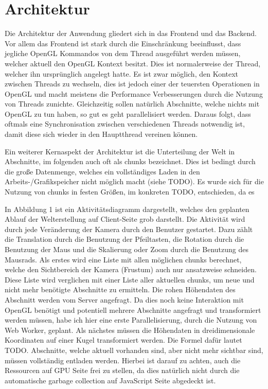 

\section{Architektur}
Die Architektur der Anwendung gliedert sich in das Frontend und das Backend. Vor allem das Frontend ist stark durch die Einschränkung beeinflusst, dass jegliche OpenGL Kommandos von dem Thread ausgeführt werden müssen, welcher aktuell den OpenGL Kontext besitzt. Dies ist normalerweise der Thread, welcher ihn ursprünglich angelegt hatte. Es ist zwar möglich, den Kontext zwischen Threads zu wechseln, dies ist jedoch einer der teuersten Operationen in OpenGL und macht meistens die Performance Verbesserungen durch die Nutzung von Threads zunichte. Gleichzeitig sollen natürlich Abschnitte, welche nichts mit OpenGL zu tun haben, so gut es geht parallelisiert werden. Daraus folgt, dass oftmals eine Synchronisation zwischen verschiedenen Threads notwendig ist, damit diese sich wieder in den Hauptthread vereinen können.

Ein weiterer Kernaspekt der Architektur ist die Unterteilung der Welt in Abschnitte, im folgenden auch oft als chunks bezeichnet. Dies ist bedingt durch die große Datenmenge, welches ein vollständiges Laden in den Arbeits-/Grafikspeicher nicht möglich macht (siehe TODO). Es wurde sich für die Nutzung von chunks in festen Größen, im konkreten TODO, entschieden, da es 

In Abbildung 1 ist ein Aktivitätsdiagramm dargestellt, welches den geplanten Ablauf der Welterstellung auf Client-Seite grob darstellt. Die Aktivität wird durch jede Veränderung der Kamera durch den Benutzer gestartet. Dazu zählt die Translation durch die Benutzung der Pfeiltasten, die Rotation durch die Benutzung der Maus und die Skalierung oder Zoom durch die Benutzung des Mausrads. Als erstes wird eine Liste mit allen möglichen chunks berechnet, welche den Sichtbereich der Kamera (Frustum) auch nur ansatzweise schneiden. Diese Liste wird verglichen mit einer Liste aller aktuellen chunks, um neue und nicht mehr benötigte Abschnitte zu ermitteln. Die rohen Höhendaten des Abschnitt werden vom Server angefragt. Da dies noch keine Interaktion mit OpenGL benötigt und potentiell mehrere Abschnitte angefragt und transformiert werden müssen, habe ich hier eine erste Parallelisierung, durch die Nutzung von Web Worker, geplant. Als nächstes müssen die Höhendaten in dreidimensionale Koordinaten auf einer Kugel transformiert werden. Die Formel dafür lautet TODO. Abschnitte, welche aktuell vorhanden sind, aber nicht mehr sichtbar sind, müssen vollständig entladen werden. Hierbei ist darauf zu achten, auch die Ressourcen auf GPU Seite frei zu stellen, da dies natürlich nicht durch die automatische garbage collection auf JavaScript Seite abgedeckt ist. 

